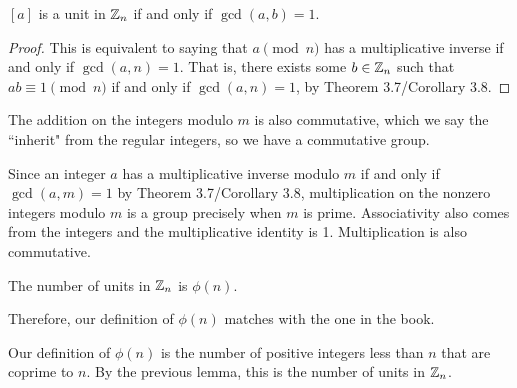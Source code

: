 \documentclass[letterpaper, 11 pt]{article}
\begin{document}
\begin{lem}[Lemma 5.1]
 $[a]$ is a unit in $\mathbb Z_n$ if and only if $\gcd(a,b)=1$.
\end{lem}
\begin{proof}
 This is equivalent to saying that $a \pmod n$ has a multiplicative inverse if and only if $\gcd(a,n)=1$. That is, there exists some $b\in \mathbb Z_n$ such that $ab\equiv 1\pmod n$ if and only if $\gcd(a,n)=1$, by Theorem 3.7/Corollary 3.8.
\end{proof}
The addition on the integers modulo $m$ is also commutative, which we say the ``inherit" from the regular integers, so we have a commutative group.
  
   Since an integer $a$ has a multiplicative inverse modulo $m$ if and only if $\gcd(a,m)=1$ by Theorem 3.7/Corollary 3.8, multiplication on the nonzero integers modulo $m$ is a group precisely when $m$ is prime. Associativity also comes from the integers and the multiplicative identity is 1. Multiplication is also commutative. 
      
\begin{br}[5 minutes]
 The number of units in $\mathbb Z_n$ is $\phi(n)$.
\end{br}
 Therefore, our definition of $\phi(n)$ matches with the one in the book.
\begin{solution}
 Our definition of $\phi(n)$ is the number of positive integers less than $n$ that are coprime to $n$. By the previous lemma, this is the number of units in $\mathbb Z_n$.
\end{solution}


\end{document}

